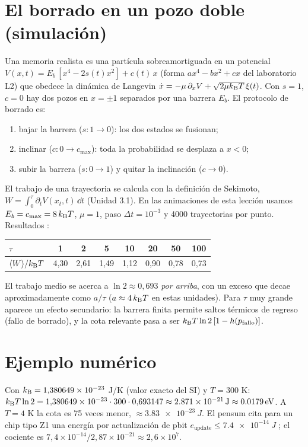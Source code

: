 \documentclass[11pt,a4paper]{article}
\begin{document}
\section{El borrado en un pozo doble (simulación)}
Una memoria realista es una partícula sobreamortiguada en un potencial
$V(x,t)=E_b\,[x^4-2s(t)x^2]+c(t)\,x$ (forma $ax^4-bx^2+cx$ del laboratorio L2) que obedece la dinámica de Langevin
$\dot x=-\mu\,\partial_xV+\sqrt{2\mu k_{\mathrm B} T}\,\xi(t)$. Con $s=1$, $c=0$ hay dos pozos en $x=\pm1$ separados
por una barrera $E_b$. El protocolo de borrado es:
\begin{enumerate}[nosep]
\item bajar la barrera ($s:1\to0$): los dos estados se fusionan;
\item inclinar ($c:0\to c_{\max}$): toda la probabilidad se desplaza a $x<0$;
\item subir la barrera ($s:0\to1$) y quitar la inclinación ($c\to0$).
\end{enumerate}
El trabajo de una trayectoria se calcula con la definición de Sekimoto,
$W=\int_0^\tau \partial_tV(x_t,t)\,\dd t$ (Unidad 3.1). En las animaciones de esta lección usamos
$E_b=c_{\max}=8\,k_{\mathrm B} T$, $\mu=1$, paso $\Delta t=10^{-3}$ y 4000 trayectorias por punto. Resultados
\evS:
\begin{center}
\begin{tabular}{lccccccc}\toprule
$\tau$ & 1 & 2 & 5 & 10 & 20 & 50 & 100\\\midrule
$\langle W\rangle/k_{\mathrm B} T$ & 4,30 & 2,61 & 1,49 & 1,12 & 0,90 & 0,78 & 0,73\\\bottomrule
\end{tabular}
\end{center}
El trabajo medio se acerca a $\ln 2\approx0{,}693$ \emph{por arriba}, con un exceso que decae
aproximadamente como $a/\tau$ ($a\approx4\,k_{\mathrm B} T$ en estas unidades). Para $\tau$ muy grande aparece un
efecto secundario: la barrera finita permite saltos térmicos de regreso (fallo de borrado), y la
cota relevante pasa a ser $k_{\mathrm B} T\ln2\,[1-h(p_{\text{fallo}})]$.

\section{Ejemplo numérico}
\begin{ejemplo}
Con $k_{\mathrm B}=1{,}380649\times10^{-23}$ J/K (valor exacto del SI) y $T=300$ K:
$k_{\mathrm B} T\ln2=1{,}380649\times10^{-23}\cdot300\cdot0{,}693147\approx\SI{2.871e-21}{J}\approx\SI{0.0179}{eV}$.
A $T=4$ K la cota es 75 veces menor, $\approx\SI{3.83e-23}{J}$.
El pensum cita para un chip tipo Z1 una energía por actualización de pbit $e_{\text{update}}\le
\SI{7.4e-14}{J}$ \evP; el cociente es $7{,}4\times10^{-14}/2{,}87\times10^{-21}\approx2{,}6\times10^{7}$.
\end{ejemplo}
\end{document}
